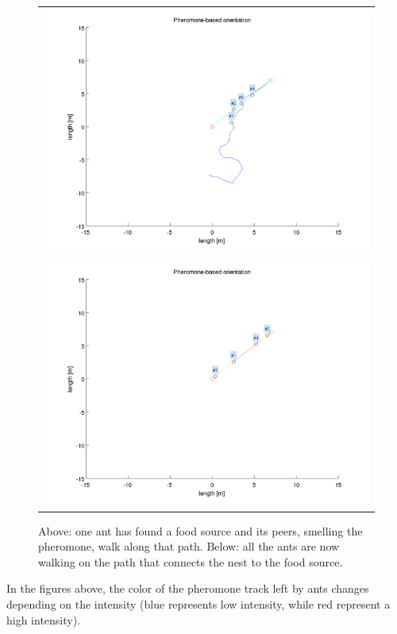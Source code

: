 \documentclass[11pt]{article}
\begin{document}
\begin{figure}
\centering
\begin{tabular}{c}
	\includegraphics[width=.9\textwidth]{../sources/results/pheromoneResults/snap_0097.png} \\
	\includegraphics[width=.9\textwidth]{../sources/results/pheromoneResults/snap_0154.png}
\end{tabular}
\caption{Above: one ant has found a food source and its peers, smelling the pheromone, walk along that path. Below: all the ants are now walking on the path that connects the nest to the food source.}
\end{figure}
In the figures above, the color of the pheromone track left by ants changes depending on the intensity (blue represents low intensity, while red represent a high intensity).
\end{document}
